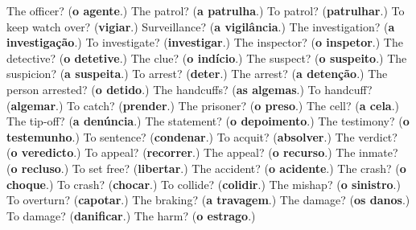 \begin{tcolorbox}[breakable,colback=teal!4,colframe=teal!35!black,title={Before you move on}]
The officer? (\textbf{o agente}.) The patrol? (\textbf{a patrulha}.) To patrol? (\textbf{patrulhar}.) To keep watch over? (\textbf{vigiar}.) Surveillance? (\textbf{a vigilância}.) The investigation? (\textbf{a investigação}.) To investigate? (\textbf{investigar}.) The inspector? (\textbf{o inspetor}.) The detective? (\textbf{o detetive}.) The clue? (\textbf{o indício}.) The suspect? (\textbf{o suspeito}.) The suspicion? (\textbf{a suspeita}.) To arrest? (\textbf{deter}.) The arrest? (\textbf{a detenção}.) The person arrested? (\textbf{o detido}.) The handcuffs? (\textbf{as algemas}.) To handcuff? (\textbf{algemar}.) To catch? (\textbf{prender}.) The prisoner? (\textbf{o preso}.) The cell? (\textbf{a cela}.) The tip-off? (\textbf{a denúncia}.) The statement? (\textbf{o depoimento}.) The testimony? (\textbf{o testemunho}.) To sentence? (\textbf{condenar}.) To acquit? (\textbf{absolver}.) The verdict? (\textbf{o veredicto}.) To appeal? (\textbf{recorrer}.) The appeal? (\textbf{o recurso}.) The inmate? (\textbf{o recluso}.) To set free? (\textbf{libertar}.) The accident? (\textbf{o acidente}.) The crash? (\textbf{o choque}.) To crash? (\textbf{chocar}.) To collide? (\textbf{colidir}.) The mishap? (\textbf{o sinistro}.) To overturn? (\textbf{capotar}.) The braking? (\textbf{a travagem}.) The damage? (\textbf{os danos}.) To damage? (\textbf{danificar}.) The harm? (\textbf{o estrago}.)
\end{tcolorbox}
